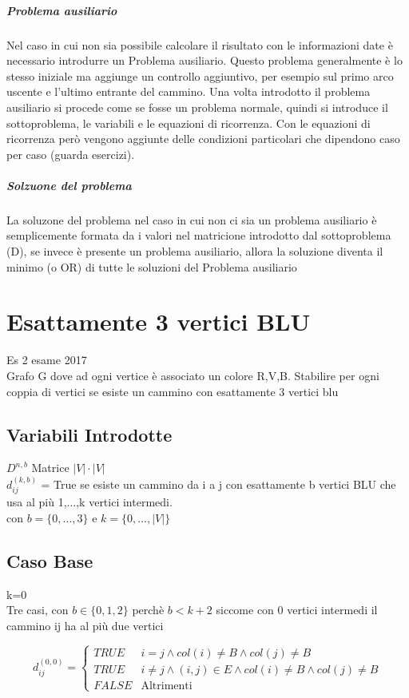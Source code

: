 \documentclass[12pt, a4paper, openany]{book}
\begin{document}
\subparagraph{Problema ausiliario} Nel caso in cui non sia possibile calcolare il risultato con le informazioni date è necessario introdurre un Problema ausiliario.
Questo problema generalmente è lo stesso iniziale ma aggiunge un controllo aggiuntivo, per esempio sul primo arco uscente e l'ultimo entrante del cammino.
Una volta introdotto il problema ausiliario si procede come se fosse un problema normale, quindi si introduce il sottoproblema, le variabili e le equazioni di ricorrenza.
Con le equazioni di ricorrenza però vengono aggiunte delle condizioni particolari che dipendono caso per caso (guarda esercizi).

\subparagraph{Solzuone del problema} La soluzone del problema nel caso in cui non ci sia un problema ausiliario è semplicemente formata da i valori nel matricione introdotto dal sottoproblema (D),
se invece è presente un problema ausiliario, allora la soluzione diventa il minimo (o OR) di tutte le soluzioni del Problema ausiliario
\section{Esattamente 3 vertici BLU} Es 2 esame 2017\\
Grafo G dove ad ogni vertice è associato un colore {R,V,B}. Stabilire per ogni coppia di vertici se esiste un cammino con esattamente 3 vertici blu

\subsection*{Variabili Introdotte}
$D^{n,b}$ Matrice $|V|\cdot|V|$\\
$d^{(k,b)}_{ij}$ = True se esiste un cammino da i a j con esattamente b vertici BLU che usa al più {1,...,k} vertici intermedi.\\
con $b = \{0,...,3\}$ e $k=\{0,...,|V|\}$

\subsection*{Caso Base} k=0\\
Tre casi, con $b \in \{0,1,2\}$ perchè $b < k+2$ siccome con 0 vertici intermedi il cammino ij ha al più due vertici

\begin{equation*}
	d_{ij}^{(0,0)} = \begin{cases}
		TRUE  & i=j\land col(i)\neq B\land col(j)\neq B                      \\
		TRUE  & i\neq j\land (i,j)\in E \land col(i)\neq B\land col(j)\neq B \\
		FALSE & \text{Altrimenti}
	\end{cases}
\end{equation*}
\end{document}
